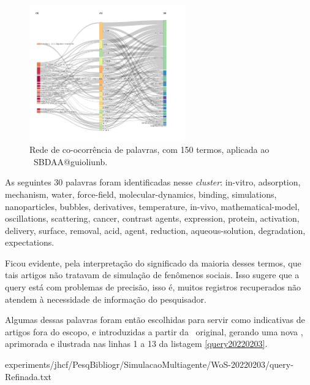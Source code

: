 \begin{figure}[htp]
    \centering
    \includegraphics[clip=true,trim={9cm 0cm 7cm 0cm },width=0.6\textwidth]{experiments/guioliunb/AnaliseBibliometrica/SocialBigDataAnalysis/3FSE-referencesXauthorsXkeywords.png}
    \caption{Rede de co-ocorrência de palavras, com 150 termos, aplicada ao \dataset\   SBDAA@guioliunb.}
    \label{fig:SBDAA@guioliunb:redecoocorr-150-termos}
\end{figure}

As seguintes 30 palavras foram identificadas nesse \textit{cluster}:
in-vitro,
adsorption,
mechanism,
water,
force-field,
molecular-dynamics,
binding,
simulations,
nanoparticles,
bubbles,
derivatives,
temperature,
in-vivo,
mathematical-model,
oscillations,
scattering,
cancer,
contrast agents,
expression,
protein,
activation,
delivery,
surface,
removal,
acid,
agent,
reduction,
aqueous-solution,
degradation,
expectations.

Ficou evidente, pela interpretação do significado da maioria desses termos, que tais artigos não tratavam de simulação de fenômenos sociais. Isso sugere que a query está com problemas de precisão, isso é, muitos registros recuperados não atendem à necessidade de informação do pesquisador. 

Algumas dessas palavras foram então escolhidas para servir como indicativas de artigos fora do escopo, e introduzidas a partir da \query\  original, gerando uma nova \query, aprimorada e ilustrada nas linhas 1 a 13 da listagem \ref{query20220203}.


{experiments/jhcf/PesqBibliogr/SimulacaoMultiagente/WoS-20220203/query-Refinada.txt}

